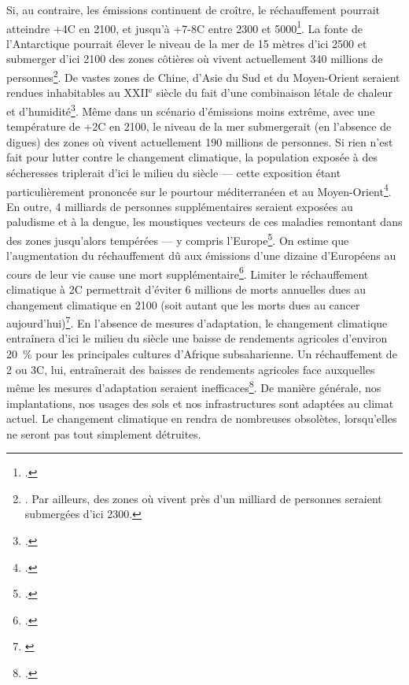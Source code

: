 \documentclass[a5paper,french,openany]{memoir}
\begin{document}
Si, au contraire, les émissions continuent de croître, le réchauffement pourrait atteindre +4\textdegree{}C en 2100, et jusqu'à +7-8\textdegree{}C entre 2300 et 5000\footnote{\citet{montenegro_long_2007}.}. La fonte de l'Antarctique pourrait élever le niveau de la mer de 15 mètres d'ici 2500 et submerger d'ici 2100 des zones côtières où vivent actuellement 340 millions de personnes\footnote{\cite{kulp_new_2019,deconto_contribution_2016,kopp_evolving_2017}. Par ailleurs, des zones où vivent près d'un milliard de personnes seraient submergées d'ici 2300.}. De vastes zones de Chine, d'Asie du Sud et du Moyen-Orient seraient rendues inhabitables au XXII$^\text{e}$ siècle du fait d'une combinaison létale de chaleur et d'humidité\footnote{\citet{pal_future_2016,im_deadly_2017,kang_north_2018}.}. Même dans un scénario d'émissions moins extrême, avec une température de +2\textdegree{}C en 2100, le niveau de la mer submergerait (en l'absence de digues) des zones où vivent actuellement 190 millions de personnes. %
Si rien n'est fait pour lutter contre le changement climatique, la population exposée à des sécheresses triplerait d'ici le milieu du siècle --- cette exposition étant particulièrement prononcée sur le pourtour méditerranéen et au Moyen-Orient\footnote{\cite{elliott_constraints_2014,marzi_assessing_2021}.}. En outre, 4 milliards de personnes supplémentaires seraient exposées au paludisme et à la dengue, les moustiques vecteurs de ces maladies remontant dans des zones jusqu'alors tempérées --- y compris l'Europe\footnote{\cite{colon-gonzalez_projecting_2021}.}. On estime que l'augmentation du réchauffement dû aux émissions d'une dizaine d'Européens au cours de leur vie cause une mort supplémentaire\footnote{\cite{bressler_mortality_2021}.}. Limiter le réchauffement climatique à 2\textdegree{}C permettrait d'éviter 6 millions de morts annuelles dues au changement climatique en 2100 (soit autant que les morts dues au cancer aujourd'hui)\footnote{\cite{carleton_valuing_2022}}. En l'absence de mesures d'adaptation, le changement climatique entraînera d'ici le milieu du siècle une baisse de rendements agricoles d'environ 20~\% pour les principales cultures d'Afrique subsaharienne. Un réchauffement de 2 ou 3\textdegree{}C, lui, entraînerait des baisses de rendements agricoles face auxquelles même les mesures d'adaptation seraient inefficaces\footnote{\cite{schlenker_robust_2010,moore_new_2017}.}. De manière générale, nos implantations, nos usages des sols et nos infrastructures sont adaptées au climat actuel. Le changement climatique en rendra de nombreuses obsolètes, lorsqu'elles ne seront pas tout simplement détruites. 
\end{document}
